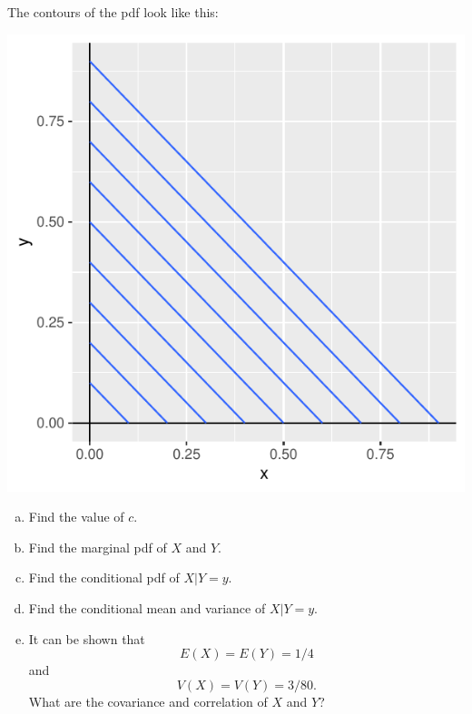 \begin{frame}
\begin{block}{\examplectd}
The contours of the pdf look like this:

\begin{center}
\includegraphics[height=.7\textheight]{figure/contour-1}
\end{center}
\end{block}
\end{frame}

\begin{frame}
\begin{block}{\examplectd}

\begin{enumerate}[a)]
\item Find the value of $c$.
\item Find the marginal pdf of $X$ and $Y$.
\item Find the conditional pdf of $X|Y=y$. 
\item Find the conditional mean and variance of $X|Y=y$.
\item It can be shown that
$$
E(X)=E(Y)=1/4
$$
and
$$
V(X)=V(Y)=3/80.
$$
What are the covariance and correlation of $X$ and $Y$?
\end{enumerate}
\end{block}
\end{frame}

